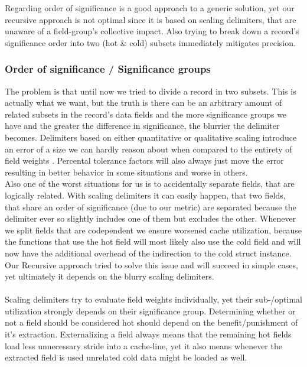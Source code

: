 Regarding order of significance is a good approach to a generic solution, yet our recursive approach is not optimal since it is based on scaling delimiters, that are unaware of a field-group's collective impact. Also trying to break down a record's significance order into two (hot \& cold) subsets immediately mitigates precision.

\subsubsection{Order of significance / Significance groups}\label{sig_groups}
The problem is that until now we tried to divide a record in two subsets. This is actually what we want, but the truth is there can be an arbitrary amount of related subsets in the record's data fields and the more significance groups we have and the greater the difference in significance, the blurrier the delimiter becomes. Delimiters based on either quantitative or qualitative scaling introduce an error of a size we can hardly reason about when compared to the entirety of field weights . Percental tolerance factors will also always just move the error resulting in better behavior in some situations and worse in others.\\
Also one of the worst situations for us is to accidentally separate fields, that are logically related. With scaling delimiters it can easily happen, that two fields, that share an order of significance (due to our metric) are separated because the delimiter ever so slightly includes one of them but excludes the other. Whenever we split fields that are codependent we ensure worsened cache utilization, because the functions that use the hot field will most likely also use the cold field and will now have the additional overhead of the indirection to the cold struct instance. Our Recursive approach tried to solve this issue and will succeed in simple cases, yet ultimately it depends on the blurry scaling delimiters.\\\\
Scaling delimiters try to evaluate field weights individually, yet their sub-/optimal utilization strongly depends on their significance group. Determining whether or not a field should be considered hot should depend on the benefit/punishment of it's extraction. Externalizing a field always means that the remaining hot fields load less unnecessary stride into a cache-line, yet it also means whenever the extracted field is used unrelated cold data might be loaded as well.\\
